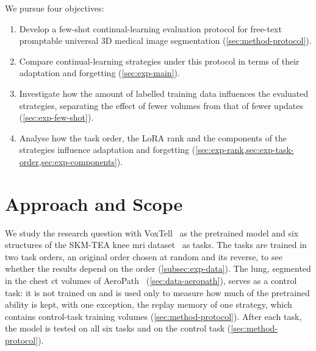 We pursue four objectives:
\begin{enumerate}
  \item Develop a few-shot continual-learning evaluation protocol for free-text promptable universal 3D medical image segmentation (\cref{sec:method-protocol}).
  \item Compare continual-learning strategies under this protocol in terms of their adaptation and forgetting (\cref{sec:exp-main}).
  \item Investigate how the amount of labelled training data influences the evaluated strategies, separating the effect of fewer volumes from that of fewer updates (\cref{sec:exp-few-shot}).
  \item Analyse how the task order, the LoRA rank and the components of the strategies influence adaptation and forgetting (\cref{sec:exp-rank,sec:exp-task-order,sec:exp-components}).
\end{enumerate}

\section{Approach and Scope}
\label{sec:intro-approach}

We study the research question with VoxTell~\cite{rokuss2025voxtellfreetextpromptableuniversal} as the pretrained model and six structures of the SKM-TEA knee \gls{mri} dataset~\cite{desai2021skmtea} as tasks.
The tasks are trained in two task orders, an original order chosen at random and its reverse, to see whether the results depend on the order (\cref{subsec:exp-data}).
The lung, segmented in the chest \gls{ct} volumes of AeroPath~\cite{støverud2023aeropathairwaysegmentationbenchmark} (\cref{sec:data-aeropath}), serves as a control task: it is not trained on and is used only to measure how much of the pretrained ability is kept, with one exception, the replay memory of one strategy, which contains control-task training volumes (\cref{sec:method-protocol}).
After each task, the model is tested on all six tasks and on the control task (\cref{sec:method-protocol}).

